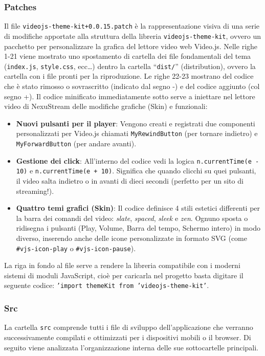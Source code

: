 \documentclass[11pt,a4paper]{article}
\begin{document}
\subsubsection{Patches}
Il file \texttt{videojs-theme-kit+0.0.15.patch} è la rappresentazione visiva di una serie di modifiche apportate alla struttura della libreria \texttt{videojs-theme-kit}, ovvero un pacchetto per personalizzare la grafica del lettore video web Video.js. Nelle righe 1-21 viene mostrato uno spostamento di cartella dei file fondamentali del tema (\texttt{index.js}, \texttt{style.css}, ecc\dots) dentro la cartella ``\texttt{dist/}'' (distribution), ovvero la cartella con i file pronti per la riproduzione. Le righe 22-23 mostrano del codice che è stato rimosso o sovrascritto (indicato dal segno -) e del codice aggiunto (col segno +). Il codice minificato immediatamente sotto serve a iniettare nel lettore video di NexuStream delle modifiche grafiche (Skin) e funzionali: 
\begin{itemize}
    \item \textbf{Nuovi pulsanti per il player}: Vengono creati e registrati due componenti personalizzati per Video.js chiamati \texttt{MyRewindButton} (per tornare indietro) e \texttt{MyForwardButton} (per andare avanti).
    \item \textbf{Gestione dei click}: All'interno del codice vedi la logica \texttt{n.currentTime(e - 10)} e \texttt{n.currentTime(e + 10)}. Significa che quando clicchi su quei pulsanti, il video salta indietro o in avanti di dieci secondi (perfetto per un sito di streaming!).
    \item \textbf{Quattro temi grafici (Skin)}: Il codice definisce 4 stili estetici differenti per la barra dei comandi del video: \textit{slate}, \textit{spaced}, \textit{sleek} e \textit{zen}. Ognuno sposta o ridisegna i pulsanti (Play, Volume, Barra del tempo, Schermo intero) in modo diverso, inserendo anche delle icone personalizzate in formato SVG (come \texttt{\#vjs-icon-play} o \texttt{\#vjs-icon-pause}).
\end{itemize}
La riga in fondo al file serve a rendere la libreria compatibile con i moderni sistemi di moduli JavaScript, cioè per caricarla nel progetto basta digitare il seguente codice: \texttt{'import themeKit from 'videojs-theme-kit'}.

\subsubsection{Src}
La cartella \texttt{src} comprende tutti i file di sviluppo dell'applicazione che verranno successivamente compilati e ottimizzati per i dispositivi mobili o il browser. Di seguito viene analizzata l'organizzazione interna delle sue sottocartelle principali.
\end{document}
